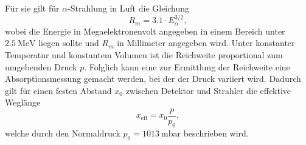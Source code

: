 Für sie gilt für $\alpha$-Strahlung in Luft die Gleichung
\begin{equation}
  R_m = \num{3.1} \cdot E_{\alpha}^{3/2},
\end{equation}
wobei die Energie in Megaelektronenvolt angegeben in einem Bereich unter $\SI{2,5}{\mega\electronvolt}$ liegen sollte und $R_m$ in Millimeter angegeben wird.
Unter konstanter Temperatur und konstantem Volumen ist die Reichweite proportional zum umgebenden Druck $p$.
Folglich kann eine zur Ermittlung der Reichweite eine Absorptionsmessung gemacht werden, bei der der Druck variiert wird.
Dadurch gilt für einen festen Abstand $x_0$ zwischen Detektor und Strahler die effektive Weglänge
\begin{equation}
  x_{\text{eff}} = x_0 \frac{p}{p_0},
  \label{eqn:xeff}
\end{equation}
welche durch den Normaldruck $p_0 = \SI{1013}{\milli\bar}$ beschrieben wird. \cite{skript}


